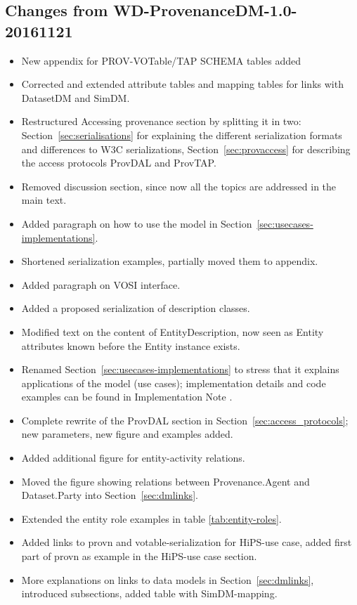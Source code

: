 \documentclass[11pt,a4paper]{ivoa}
\begin{document}
\begin{appendices}
\subsection{Changes from WD-ProvenanceDM-1.0-20161121}
\begin{itemize}
\item New appendix for PROV-VOTable/TAP SCHEMA tables added
\item Corrected and extended attribute tables and mapping tables for links with DatasetDM and SimDM.
\item Restructured Accessing provenance section by splitting it in two: Section~\ref{sec:serialisations} for explaining the different serialization formats and differences to W3C serializations, Section~\ref{sec:provaccess} for describing the access protocols ProvDAL and ProvTAP.
\item Removed discussion section, since now all the topics are addressed in the main text.
\item Added paragraph on how to use the model in Section~\ref{sec:usecases-implementations}.
\item Shortened serialization examples, partially moved them to appendix.
\item Added paragraph on VOSI interface.
\item Added a proposed serialization of description classes.
\item Modified text on the content of EntityDescription, now seen as Entity attributes known before the Entity instance exists.
\item Renamed Section~\ref{sec:usecases-implementations} to stress that it explains applications of the model (use cases); implementation details and code examples can be found in Implementation Note \citep{std:ProvenanceImplementationNote}.
\item Complete rewrite of the ProvDAL section in Section~\ref{sec:access_protocols}; new parameters, new figure and examples added.
\item Added additional figure for entity-activity relations.
\item Moved the figure showing relations between Provenance.Agent and Dataset.Party into Section~\ref{sec:dmlinks}.
\item Extended the entity role examples in table \ref{tab:entity-roles}.
\item Added links to provn and votable-serialization for HiPS-use case, added first part of provn as example in the HiPS-use case section.
\item More explanations on links to data models in Section~\ref{sec:dmlinks}, introduced subsections, added table with SimDM-mapping.

\end{itemize}
\end{appendices}
\end{document}
